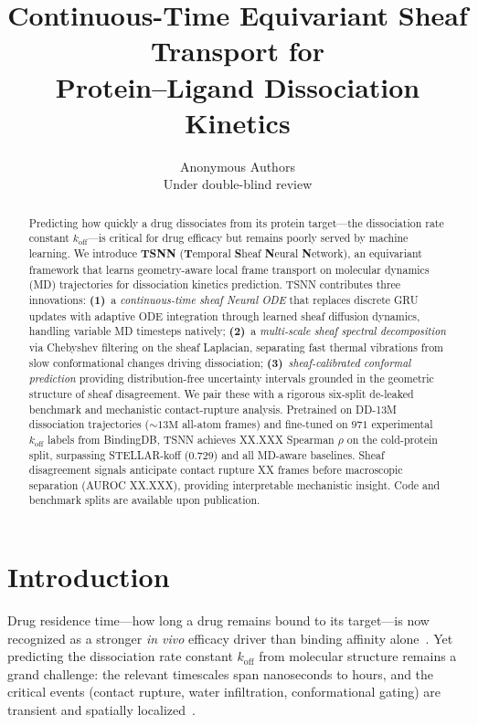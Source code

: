 \documentclass{article}
\title{Continuous-Time Equivariant Sheaf Transport for\\Protein--Ligand Dissociation Kinetics}
\author{
  Anonymous Authors\\
  Under double-blind review
}
\date{}
\begin{document}
\maketitle

\begin{abstract}
Predicting how quickly a drug dissociates from its protein target---the
dissociation rate constant $k_\text{off}$---is critical for drug efficacy
but remains poorly served by machine learning.
We introduce \textbf{TSNN} (\textbf{T}emporal \textbf{S}heaf \textbf{N}eural
\textbf{N}etwork), an equivariant framework that learns geometry-aware
local frame transport on molecular dynamics (MD) trajectories for
dissociation kinetics prediction.
TSNN contributes three innovations:
\textbf{(1)}~a \emph{continuous-time sheaf Neural ODE} that replaces
discrete GRU updates with adaptive ODE integration through learned
sheaf diffusion dynamics, handling variable MD timesteps natively;
\textbf{(2)}~a \emph{multi-scale sheaf spectral decomposition} via
Chebyshev filtering on the sheaf Laplacian, separating fast thermal
vibrations from slow conformational changes driving dissociation;
\textbf{(3)}~\emph{sheaf-calibrated conformal prediction} providing
distribution-free uncertainty intervals grounded in the geometric
structure of sheaf disagreement.
We pair these with a rigorous six-split de-leaked benchmark and
mechanistic contact-rupture analysis.
Pretrained on DD-13M dissociation trajectories (${\sim}13\text{M}$ all-atom
frames) and fine-tuned on $971$ experimental $k_\text{off}$ labels from
BindingDB, TSNN achieves XX.XXX Spearman $\rho$ on the cold-protein
split, surpassing STELLAR-koff (0.729) and all MD-aware baselines.
Sheaf disagreement signals anticipate contact rupture XX frames before
macroscopic separation (AUROC XX.XXX), providing interpretable
mechanistic insight.
Code and benchmark splits are available upon publication.
\end{abstract}

\section{Introduction}
\label{sec:intro}

Drug residence time---how long a drug remains bound to its target---is
now recognized as a stronger \emph{in vivo} efficacy driver than binding
affinity alone~\citep{copeland2006drug,tummino2008residence}.
Yet predicting the dissociation rate constant $k_\text{off}$ from
molecular structure remains a grand challenge: the relevant timescales
span nanoseconds to hours, and the critical events (contact rupture,
water infiltration, conformational gating) are transient and
spatially localized~\citep{bruce2018new}.
\end{document}
